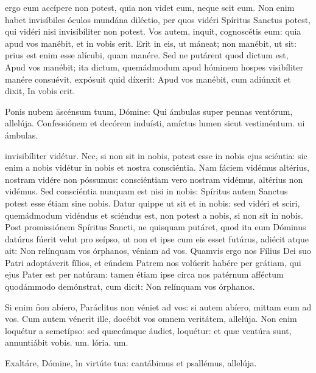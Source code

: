 \documentclass[fontsize=9pt,paper=A6,twoside,BCOR=1mm,DIV=22,headinclude]{scrarticle}
\begin{document}
\begin{multicols}{2}
 ergo eum accípere non potest, quia non videt eum, neque scit eum. Non enim habet invisíbiles óculos mundána diléctio, per quos vidéri Spíritus Sanctus potest, qui vidéri nisi invisibíliter non potest. Vos autem, inquit, cognoscétis eum: quia apud vos manébit, et in vobis erit. Erit in eis, ut máneat; non manébit, ut sit: prius est enim esse alícubi, quam manére. Sed ne putárent quod dictum est, Apud vos manébit; ita dictum, quemádmodum apud hóminem hospes visibíliter manére consuévit, expósuit quid díxerit: Apud vos manébit, cum adiúnxit et dixit, In vobis erit.

\R Ponis nubem \f ascénsum tuum, Dómine:
\red{*} Qui ámbulas super pennas ventórum, allelúja.
\V Confessiónem et decórem induísti, amíctus lumen sicut vestiméntum.
ui ámbulas.

 invisibíliter vidétur. Nec, si non sit in nobis, potest esse in nobis ejus sciéntia: sic enim a nobis vidétur in nobis et nostra consciéntia. Nam fáciem vidémus altérius, nostram vidére non póssumus: consciéntiam vero nostram vidémus, altérius non vidémus. Sed consciéntia nunquam est nisi in nobis: Spíritus autem Sanctus potest esse étiam sine nobis. Datur quippe ut sit et in nobis: sed vidéri et sciri, quemádmodum vidéndus et sciéndus est, non potest a nobis, si non sit in nobis. Post promissiónem Spíritus Sancti, ne quisquam putáret, quod ita eum Dóminus datúrus fúerit velut pro seípso, ut non et ipse cum eis esset futúrus, adiécit atque ait: Non relínquam vos órphanos, véniam ad vos. Quamvis ergo nos Fílius Dei suo Patri adoptáverit fílios, et eúndem Patrem nos volúerit habére per grátiam, qui ejus Pater est per natúram: tamen étiam ipse circa nos patérnum afféctum quodámmodo demónstrat, cum dicit: Non relínquam vos órphanos.

\R Si enim \f non abíero, Paráclitus non véniet ad vos: si autem abíero, mittam eum ad vos.
\red{*} Cum autem vénerit ille, docébit vos omnem veritátem, allelúja.
\V Non enim loquétur a semetípso: sed quæcúmque áudiet, loquétur: et quæ ventúra sunt, annuntiábit vobis.
um.
lória.
um.


\A Exaltáre, Dómine, \f in virtúte tua: cantábimus et psallémus, allelúja.








\end{multicols}
\end{document}
